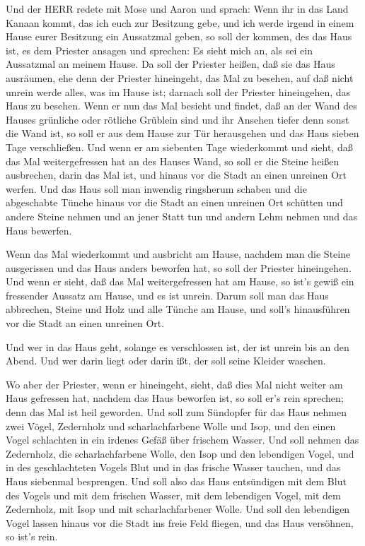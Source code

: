  Und der HERR redete mit Mose und Aaron und sprach:
 Wenn ihr in das Land Kanaan kommt, das ich euch zur
Besitzung gebe, und ich werde irgend in einem Hause eurer Besitzung ein
Aussatzmal geben,  so soll der kommen, des das Haus ist, es
dem Priester ansagen und sprechen: Es sieht mich an, als sei ein
Aussatzmal an meinem Hause.  Da soll der Priester heißen,
daß sie das Haus ausräumen, ehe denn der Priester hineingeht, das Mal zu
besehen, auf daß nicht unrein werde alles, was im Hause ist; darnach
soll der Priester hineingehen, das Haus zu besehen.  Wenn
er nun das Mal besieht und findet, daß an der Wand des Hauses grünliche
oder rötliche Grüblein sind und ihr Ansehen tiefer denn sonst die Wand
ist,  so soll er aus dem Hause zur Tür herausgehen und das
Haus sieben Tage verschließen.  Und wenn er am siebenten
Tage wiederkommt und sieht, daß das Mal weitergefressen hat an des
Hauses Wand,  so soll er die Steine heißen ausbrechen,
darin das Mal ist, und hinaus vor die Stadt an einen unreinen Ort
werfen.  Und das Haus soll man inwendig ringsherum schaben
und die abgeschabte Tünche hinaus vor die Stadt an einen unreinen Ort
schütten  und andere Steine nehmen und an jener Statt tun
und andern Lehm nehmen und das Haus bewerfen.

 Wenn das Mal wiederkommt und ausbricht am Hause, nachdem
man die Steine ausgerissen und das Haus anders beworfen hat,
 so soll der Priester hineingehen. Und wenn er sieht, daß
das Mal weitergefressen hat am Hause, so ist's gewiß ein fressender
Aussatz am Hause, und es ist unrein.  Darum soll man das
Haus abbrechen, Steine und Holz und alle Tünche am Hause, und soll's
hinausführen vor die Stadt an einen unreinen Ort.

 Und wer in das Haus geht, solange es verschlossen ist, der
ist unrein bis an den Abend.  Und wer darin liegt oder
darin ißt, der soll seine Kleider waschen.

 Wo aber der Priester, wenn er hineingeht, sieht, daß dies
Mal nicht weiter am Haus gefressen hat, nachdem das Haus beworfen ist,
so soll er's rein sprechen; denn das Mal ist heil geworden.
 Und soll zum Sündopfer für das Haus nehmen zwei Vögel,
Zedernholz und scharlachfarbene Wolle und Isop,  und den
einen Vogel schlachten in ein irdenes Gefäß über frischem Wasser.
 Und soll nehmen das Zedernholz, die scharlachfarbene
Wolle, den Isop und den lebendigen Vogel, und in des geschlachteten
Vogels Blut und in das frische Wasser tauchen, und das Haus siebenmal
besprengen.  Und soll also das Haus entsündigen mit dem
Blut des Vogels und mit dem frischen Wasser, mit dem lebendigen Vogel,
mit dem Zedernholz, mit Isop und mit scharlachfarbener Wolle.
 Und soll den lebendigen Vogel lassen hinaus vor die Stadt
ins freie Feld fliegen, und das Haus versöhnen, so ist's rein.

